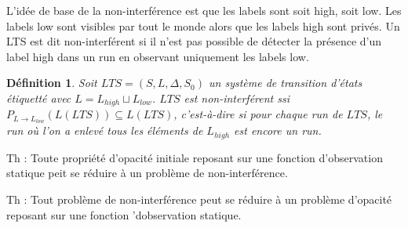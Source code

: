 \documentclass[10pt,a4paper]{article}
\newtheorem {mydef} {D\'efinition}
\begin{document}
L'id\'ee de base de la non-interf\'erence est que les labels sont soit high, soit low. Les labels low sont visibles par tout le monde alors que les labels high sont priv\'es. Un LTS est dit non-interf\'erent si il n'est pas possible de d\'etecter la pr\'esence d'un label high dans un run en observant uniquement les labels low.

\begin{mydef}
  Soit $LTS = (S,L,\Delta,S_0)$ un syst\`eme de transition d'\'etats \'etiquett\'e avec $L=L_{high}\sqcup L_{low}$. $LTS$ est non-interf\'erent ssi $P_{L\to L_{low}}(L(LTS)) \subseteq L(LTS)$, c'est-\`a-dire si pour chaque run de $LTS$, le run o\`u l'on a enlev\'e tous les \'el\'ements de $L_{high}$ est encore un run.
\end{mydef}

Th : Toute propri\'et\'e d'opacit\'e initiale reposant sur une fonction d'observation statique peit se r\'eduire \`a un probl\`eme  de non-interf\'erence.

Th : Tout probl\`eme de non-interf\'erence peut se r\'eduire \`a un probl\`eme d'opacit\'e reposant sur une fonction 'dobservation statique.
\end{document}
